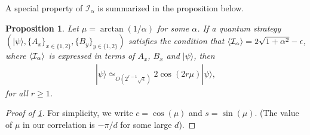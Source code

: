 \documentclass[11pt,letterpaper]{article}
\newcommand{\ket}[1]{|#1\rangle}
\DeclarePairedDelimiter{\ip}{\langle}{\rangle}
\newcommand{\1}{\mathbb{1}}
\newcommand{\I}{\mathcal{I}}
\newcommand{\appd}[1]{\simeq_{#1}}
\newtheorem{proposition}[theorem]{Proposition}
\theoremstyle{definition}
\begin{document}
A special property of $\I_\alpha$ is summarized in the proposition below.
\begin{proposition}
\label{prop:2d-subspace}
	Let $\mu = \arctan(1/\alpha)$ for some $\alpha$.
	If a quantum strategy $(\ket{\psi}, \{A_x\}_{x \in \{1,2\}}, \{B_y\}_{y \in \{1,2\}})$ 
	satisfies the condition that $\ip{\I_\alpha} = 2\sqrt{1+\alpha^2}-\epsilon$, where 
	$\ip{\I_\alpha}$ is expressed in terms of $A_x$,  $B_x$ and $\ket{\psi}$,
	then  
	\begin{align}
		[(B_0 B_1)^r + (B_1B_0)^r] \ket{\psi} \appd{O(2^{r-1}\sqrt{\epsilon})} 2\cos(2r\mu)\ket{\psi},
	\end{align}
	for all $r \geq 1$.
\end{proposition}
\begin{proof}[Proof of \cref{prop:2d-subspace}]
	For simplicity, we write $c = \cos(\mu)$ and $s = \sin(\mu)$.
	(The value of $\mu$ in our correlation is $-\pi/d$ for some large $d$).
	

\end{proof}
\end{document}
